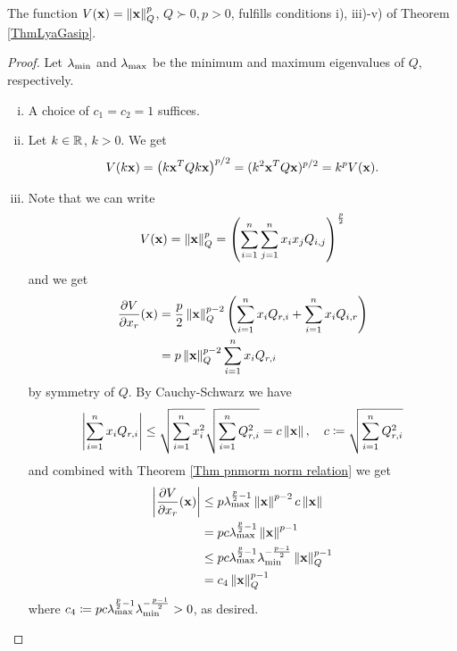 \documentclass[a4paper,12pt,twoside,BCOR=10mm]{scrbook}
\begin{document}
\begin{theorem}
The function $V(\mathbf{x}) = \left\lVert\mathbf{x}\right\rVert_Q^p$, $Q\succ 0, p > 0$, fulfills conditions i), iii)-v) of Theorem \ref{ThmLyaGasip}.
\end{theorem}
\begin{proof}
Let $\lambda_{\min}$ and $\lambda_{\max}$ be the minimum and maximum eigenvalues of $Q$, respectively.
\begin{enumerate}[i)]
    \item A choice of $c_1 = c_2 = 1$ suffices.
\setcounter{enumi}{2}
    \item Let $k\in\mathbb{R}^{}$, $k > 0$. We get
        \begin{align*}
            V(k\mathbf{x}) = \left(k\mathbf{x}^TQk\mathbf{x}\right)^{p/2} = (k^2 \mathbf{x}^T Q \mathbf{x})^{p / 2} = k^p V(\mathbf{x}).
        \end{align*}
    \item Note that we can write
        \begin{align*}
            V(\mathbf{x}) = \left\lVert\mathbf{x}\right\rVert_Q^p = \left(\sum_{i = 1}^n \sum_{j = 1}^n x_ix_j Q_{i, j}\right)^\frac{p}{2}
        \end{align*}
        and we get
        \begin{align*}
            \frac{\partial V}{\partial x_r} (\mathbf{x}) &= \frac{p}{2}\left\lVert\mathbf{x}\right\rVert_{Q}^{p - 2} \left(\sum_{i = 1}^n x_i Q_{r, i} + \sum_{i = 1}^n x_i Q_{i, r}\right)\\
            &= p\left\lVert\mathbf{x}\right\rVert_{Q}^{p - 2} \sum_{i = 1}^n x_i Q_{r,i}\\
        \end{align*}
        by symmetry of $Q$. By Cauchy-Schwarz we have
        \begin{align*}
            \left\lvert \sum_{i = 1}^n x_i Q_{r,i} \right\rvert \leq \sqrt{\sum\limits_{i = 1}^nx_i^2}\sqrt{\sum\limits_{i = 1}^n Q_{r,i}^2} = c\left\lVert\mathbf{x}\right\rVert, \quad c \coloneqq \sqrt{\sum\limits_{i = 1}^n Q_{r,i}^2}
        \end{align*}
        and combined with Theorem \ref{Thm pnmorm norm relation} we get
        \begin{align*}
            \left | \frac{\partial V}{\partial x_r}(\mathbf{x}) \right | &\leq p\lambda_{\max}^{\frac{p}{2} - 1} \left\lVert\mathbf{x}\right\rVert^{p - 2}c\left\lVert\mathbf{x}\right\rVert\\
            &= pc\lambda_{\max}^{\frac{p}{2}-1}\left\lVert\mathbf{x}\right\rVert^{p-1}\\
            &\leq pc\lambda_{\max}^{\frac{p}{2}-1}\lambda_{\min}^{-\frac{p -1}{2}} \left\lVert\mathbf{x}\right\rVert_{Q}^{p - 1}\\
            &= c_4 \left\lVert\mathbf{x}\right\rVert_{Q}^{p-1}
        \end{align*}
        where $c_4 \coloneqq pc\lambda_{\max}^{\frac{p}{2}-1}\lambda_{\min}^{-\frac{p -1}{2}} > 0$, as desired.

\end{enumerate}
\end{proof}
\end{document}
